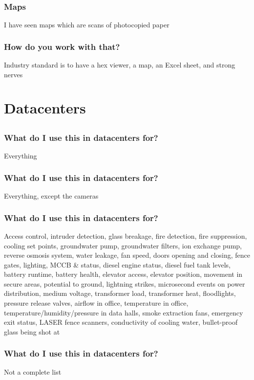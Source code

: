\documentclass[aspectratio=169]{beamer}
\begin{document}
\begin{frame}
	\frametitle{Maps}
	\centering
	\vfill
	I have seen maps which are scans of photocopied paper
	\vfill
\end{frame}

\begin{frame}
	\frametitle{How do you work with that?}
	\centering
	\vfill
	Industry standard is to have a hex viewer, a map, an Excel sheet, and strong nerves
	\vfill
\end{frame}



\section{Datacenters}


\subsection{}

\begin{frame}
	\frametitle{What do I use this in datacenters for?}
	\centering
	\vfill
	Everything
	\vfill
\end{frame}

\begin{frame}
	\frametitle{What do I use this in datacenters for?}
	\centering
	\vfill
	Everything, except the cameras
	\vfill
\end{frame}


\begin{frame}
	\frametitle{What do I use this in datacenters for?}
	\centering
	\vfill
	Access control, intruder detection, glass breakage, fire detection, fire suppression, cooling set points, groundwater pump, groundwater filters, ion exchange pump, reverse osmosis system, water leakage, fan speed, doors opening and closing, fence gates, lighting, MCCB \& status, diesel engine status, diesel fuel tank levels, battery runtime, battery health, elevator access, elevator position, movement in secure areas, potential to ground, lightning strikes, microsecond events on power distribution, medium voltage, transformer load, transformer heat, floodlights, pressure release valves, airflow in office, temperature in office, temperature/humidity/pressure in data halls, smoke extraction fans, emergency exit status, LASER fence scanners, conductivity of cooling water, bullet-proof glass being shot at
	\vfill
\end{frame}

\begin{frame}
	\frametitle{What do I use this in datacenters for?}
	\centering
	\vfill
	Not a complete list
	\vfill
\end{frame}
\end{document}

